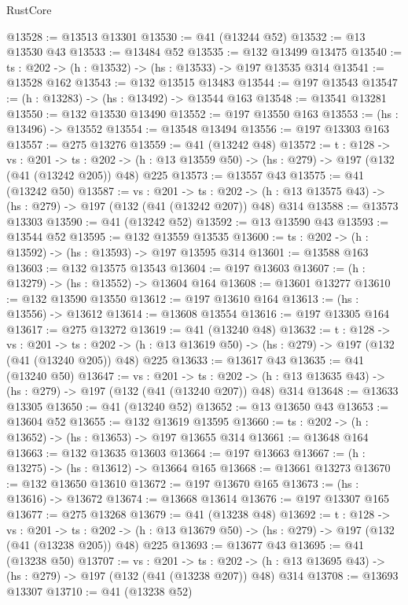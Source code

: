 \begin{lexlean}{RustCore}
\begin{coremodule}
@13528 := @13513 @13301
@13530 := @41 (@13244 @52)
@13532 := @13 @13530 @43
@13533 := @13484 @52
@13535 := @132 @13499 @13475
@13540 := {ts : @202} -> (h : @13532) -> (hs : @13533) -> @197 @13535 @314
@13541 := @13528 @162
@13543 := @132 @13515 @13483
@13544 := @197 @13543
@13547 := (h : @13283) -> (hs : @13492) -> @13544 @163
@13548 := @13541 @13281
@13550 := @132 @13530 @13490
@13552 := @197 @13550 @163
@13553 := (hs : @13496) -> @13552
@13554 := @13548 @13494
@13556 := @197 @13303 @163
@13557 := @275 @13276
@13559 := @41 (@13242 @48)
@13572 := {t : @128} ->
  {vs : @201} ->
  {ts : @202} -> (h : @13 @13559 @50) -> (hs : @279) -> @197 (@132 (@41 (@13242 @205)) @48) @225
@13573 := @13557 @43
@13575 := @41 (@13242 @50)
@13587 := {vs : @201} ->
  {ts : @202} -> (h : @13 @13575 @43) -> (hs : @279) -> @197 (@132 (@41 (@13242 @207)) @48) @314
@13588 := @13573 @13303
@13590 := @41 (@13242 @52)
@13592 := @13 @13590 @43
@13593 := @13544 @52
@13595 := @132 @13559 @13535
@13600 := {ts : @202} -> (h : @13592) -> (hs : @13593) -> @197 @13595 @314
@13601 := @13588 @163
@13603 := @132 @13575 @13543
@13604 := @197 @13603
@13607 := (h : @13279) -> (hs : @13552) -> @13604 @164
@13608 := @13601 @13277
@13610 := @132 @13590 @13550
@13612 := @197 @13610 @164
@13613 := (hs : @13556) -> @13612
@13614 := @13608 @13554
@13616 := @197 @13305 @164
@13617 := @275 @13272
@13619 := @41 (@13240 @48)
@13632 := {t : @128} ->
  {vs : @201} ->
  {ts : @202} -> (h : @13 @13619 @50) -> (hs : @279) -> @197 (@132 (@41 (@13240 @205)) @48) @225
@13633 := @13617 @43
@13635 := @41 (@13240 @50)
@13647 := {vs : @201} ->
  {ts : @202} -> (h : @13 @13635 @43) -> (hs : @279) -> @197 (@132 (@41 (@13240 @207)) @48) @314
@13648 := @13633 @13305
@13650 := @41 (@13240 @52)
@13652 := @13 @13650 @43
@13653 := @13604 @52
@13655 := @132 @13619 @13595
@13660 := {ts : @202} -> (h : @13652) -> (hs : @13653) -> @197 @13655 @314
@13661 := @13648 @164
@13663 := @132 @13635 @13603
@13664 := @197 @13663
@13667 := (h : @13275) -> (hs : @13612) -> @13664 @165
@13668 := @13661 @13273
@13670 := @132 @13650 @13610
@13672 := @197 @13670 @165
@13673 := (hs : @13616) -> @13672
@13674 := @13668 @13614
@13676 := @197 @13307 @165
@13677 := @275 @13268
@13679 := @41 (@13238 @48)
@13692 := {t : @128} ->
  {vs : @201} ->
  {ts : @202} -> (h : @13 @13679 @50) -> (hs : @279) -> @197 (@132 (@41 (@13238 @205)) @48) @225
@13693 := @13677 @43
@13695 := @41 (@13238 @50)
@13707 := {vs : @201} ->
  {ts : @202} -> (h : @13 @13695 @43) -> (hs : @279) -> @197 (@132 (@41 (@13238 @207)) @48) @314
@13708 := @13693 @13307
@13710 := @41 (@13238 @52)

\end{coremodule}
\end{lexlean}
